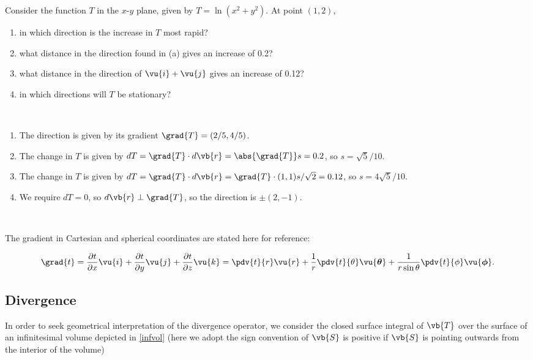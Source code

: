 \documentclass[english,a4paper,12pt]{report}
\begin{document}
{Consider the function \(T\) in the \(x\)-\(y\) plane, given by \(T = \ln (x^2+y^2)\). At point \((1,2)\),

\begin{enumerate}
	\item in which direction is the increase in \(T\) most rapid?
	\item what distance in the direction found in (a) gives an increase of 0.2?
	\item what distance in the direction of \(\vu{i} + \vu{j} \) gives an increase of 0.12?
	\item in which directions will \(T\) be stationary? 
\end{enumerate}
~
}
{\begin{enumerate}
	\item The direction is given by its gradient \(\grad{T} = (2/ 5, 4 /5) \).
	\item The change in \(T\) is given by \(dT = \grad{T} \cdot d\vb{r} = \abs{\grad{T} }s = 0.2 \), so \(s = \sqrt{5} /10 \).  
	\item The change in \(T\) is given by \(dT = \grad{T} \cdot d\vb{r} =  \grad{T} \cdot (1,1) s /\sqrt{2} = 0.12\), so \(s = 4 \sqrt{5}/ 10 \).  
	\item We require \(dT = 0\), so \(d \vb{r} \perp \grad{T} \), so the direction is \(\pm (2,-1)\).   
\end{enumerate}
~
} 



The gradient in Cartesian and spherical coordinates are stated here for reference:

\begin{equation} 
	\grad{t} = \frac{\partial t}{\partial x} \vu{i} + \frac{\partial t}{\partial y} \vu{j} + \frac{\partial t}{\partial z} \vu{k} = \pdv{t}{r}\vu{r} + \frac{1}{r}\pdv{t}{\theta}\vu{\boldsymbol{\theta } } + \frac{1}{r\sin{\theta}}\pdv{t}{\phi}\vu{\boldsymbol{\phi } }. 
\end{equation}
	
\subsection{Divergence}

	
In order to seek geometrical interpretation of the divergence operator, we consider the closed surface integral of \(\vb{T}\) over the surface of an infinitesimal volume depicted in \cref{infvol} (here we adopt the sign convention of \(\vb{S}\) is positive if \(\vb{S}\) is pointing outwards from the interior of the volume)
\end{document}
